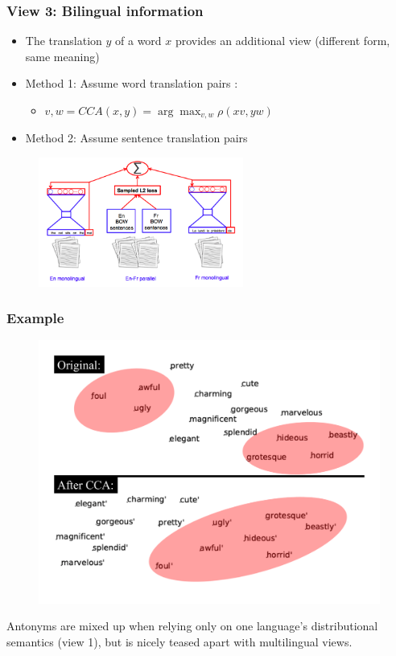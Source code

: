 \documentclass{beamer}
\newcommand{\bi}{\begin{itemize}}
\newcommand{\ei}{\end{itemize}}
\begin{document}
\begin{frame}
\frametitle{View 3: Bilingual information}
\bi
\item The translation $y$ of a word $x$ provides an additional view (different form, same meaning) 
\item Method 1: Assume word translation pairs \cite{faruqui14representation}: 
\bi
\item $v,w = CCA(x,y) = \arg\max_{v,w} \rho(xv,yw)$
\ei
\pause
\item Method 2: Assume sentence translation pairs \cite{gouws15representation}
\ei
\begin{figure}[htbp]
\begin{center}
\includegraphics[width=0.6\textwidth]{figs/gouws15}
\end{center}
\end{figure}
\vspace{1cm}
\end{frame}


\begin{frame}
\frametitle{Example~\cite{faruqui14representation}}
\begin{figure}[t]
\centering
\includegraphics[width=0.7\linewidth]{figs/faruqui-dyer}
\end{figure}
Antonyms are mixed up when relying only on one language's distributional semantics (view 1), but is nicely teased apart with multilingual views.
\end{frame}
\end{document}
